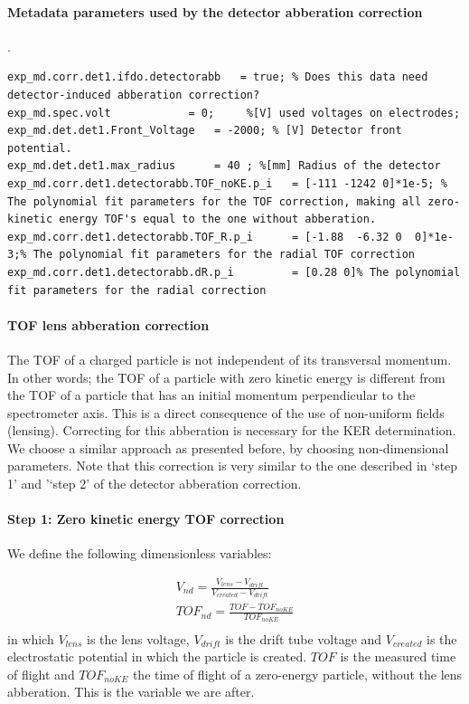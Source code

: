 \paragraph{Metadata parameters used by the detector abberation correction}
.\newline
\lstset{language=MATLAB}
\begin{lstlisting}
exp_md.corr.det1.ifdo.detectorabb	= true; % Does this data need detector-induced abberation correction?
exp_md.spec.volt			= 0;     %[V] used voltages on electrodes;
exp_md.det.det1.Front_Voltage  	= -2000; % [V] Detector front potential.
exp_md.det.det1.max_radius 		= 40 ; %[mm] Radius of the detector
exp_md.corr.det1.detectorabb.TOF_noKE.p_i	= [-111 -1242 0]*1e-5; % The polynomial fit parameters for the TOF correction, making all zero-kinetic energy TOF's equal to the one without abberation.
exp_md.corr.det1.detectorabb.TOF_R.p_i		= [-1.88  -6.32 0  0]*1e-3;% The polynomial fit parameters for the radial TOF correction
exp_md.corr.det1.detectorabb.dR.p_i			= [0.28 0]% The polynomial fit parameters for the radial correction
\end{lstlisting}

\paragraph{TOF lens abberation correction}
The TOF of a charged particle is not independent of its transversal momentum. In other words; the TOF of a particle with zero kinetic energy is different from the TOF of a particle that has an initial momentum perpendicular to the spectrometer axis. This is a direct consequence of the use of non-uniform fields (lensing). Correcting for this abberation is necessary for the KER determination. We choose a similar approach as presented before, by choosing non-dimensional parameters. Note that this correction is very similar to the one described in `step 1' and '`step 2' of the detector abberation correction.


\paragraph{Step 1: Zero kinetic energy TOF correction}
We define the following dimensionless variables:

\begin{align}
V_{nd} 		= \frac{V_{lens} - V_{drift}}{V_{created} - V_{drift}} \\
TOF_{nd} 	= \frac{TOF - TOF_{noKE}}{TOF_{noKE}} \\
\end{align}
in which $V_{lens}$ is the lens voltage, $V_{drift}$ is the drift tube voltage and $V_{created}$ is the electrostatic potential in which the particle is created. $TOF$ is the measured time of flight and $TOF_{noKE}$ the time of flight of a zero-energy particle, without the lens abberation. This is the variable we are after. 

